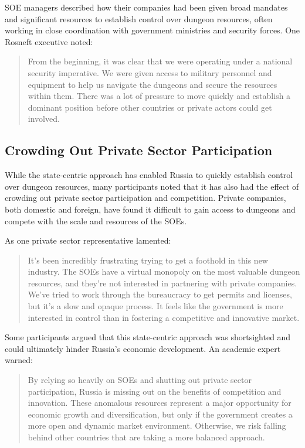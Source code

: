 \documentclass[12pt, a4paper]{article}
\begin{document}
SOE managers described how their companies had been given broad mandates and significant resources to establish control over dungeon resources, often working in close coordination with government ministries and security forces. One Rosneft executive noted:

\begin{quote}
From the beginning, it was clear that we were operating under a national security imperative. We were given access to military personnel and equipment to help us navigate the dungeons and secure the resources within them. There was a lot of pressure to move quickly and establish a dominant position before other countries or private actors could get involved.
\end{quote}

\subsection{Crowding Out Private Sector Participation}
While the state-centric approach has enabled Russia to quickly establish control over dungeon resources, many participants noted that it has also had the effect of crowding out private sector participation and competition. Private companies, both domestic and foreign, have found it difficult to gain access to dungeons and compete with the scale and resources of the SOEs.

As one private sector representative lamented:

\begin{quote}
It's been incredibly frustrating trying to get a foothold in this new industry. The SOEs have a virtual monopoly on the most valuable dungeon resources, and they're not interested in partnering with private companies. We've tried to work through the bureaucracy to get permits and licenses, but it's a slow and opaque process. It feels like the government is more interested in control than in fostering a competitive and innovative market.
\end{quote}

Some participants argued that this state-centric approach was shortsighted and could ultimately hinder Russia's economic development. An academic expert warned:

\begin{quote}
By relying so heavily on SOEs and shutting out private sector participation, Russia is missing out on the benefits of competition and innovation. These anomalous resources represent a major opportunity for economic growth and diversification, but only if the government creates a more open and dynamic market environment. Otherwise, we risk falling behind other countries that are taking a more balanced approach.
\end{quote}
\end{document}
